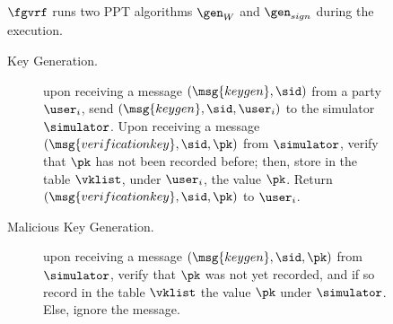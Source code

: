 \begin{figure}\scriptsize
	\begin{tcolorbox}
		{  $ \fgvrf $ runs two PPT algorithms $ \gen_W$ and $\gen_{sign} $ during the execution.
			
			 \begin{description}
				
				\item[Key Generation.] upon receiving a message $(\msg{keygen}, \sid)$ from a party $\user_i$, send $(\msg{keygen}, \sid, \user_i)$ to the simulator $\simulator$.
				Upon receiving a message $(\msg{verificationkey}, \sid, \pk)$ from $\simulator$, verify that $\pk$ has not been recorded before; then, store in the table $\vklist$, under $\user_i$, the value $\pk$.
				Return $(\msg{verificationkey}, \sid, \pk)$ to $ \user_i$.
				
				\item[Malicious Key Generation.] upon receiving a message $(\msg{keygen}, \sid, \pk)$ from $\simulator$, verify that $\pk$ was not yet recorded, and if so record in the table $\vklist$ the value $\pk$ under $\simulator$. Else, ignore the message.
				

\end{description}}
\end{tcolorbox}
\end{figure}
